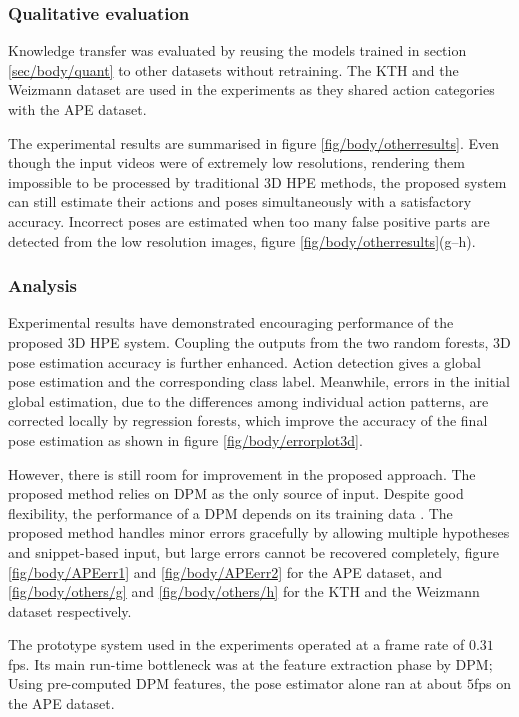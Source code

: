 

\subsubsection{Qualitative evaluation}

Knowledge transfer was evaluated by reusing the models trained in section \ref{sec/body/quant} to other datasets without retraining.
The KTH \cite{Schuldt2004} and the Weizmann \cite{Gorelick2007} dataset are used in the experiments as they shared action categories with the APE dataset. 

The experimental results are summarised in figure \ref{fig/body/otherresults}. Even though the input videos were of extremely low resolutions, rendering them impossible to be processed by traditional 3D HPE methods, the proposed system can still estimate their actions and poses simultaneously with a satisfactory accuracy. 
Incorrect poses are estimated when too many false positive parts are detected from the low resolution images, \eg figure \ref{fig/body/otherresults}(g--h). 

\subsubsection{Analysis}
Experimental results have demonstrated encouraging performance of the proposed 3D HPE system.  
Coupling the outputs from the two random forests, 3D pose estimation accuracy is further enhanced. Action detection gives a global pose estimation and the corresponding class label. Meanwhile, errors in the initial global estimation, due to the differences among individual action patterns, are corrected locally by regression forests, which improve the accuracy of the final pose estimation as shown in figure \ref{fig/body/errorplot3d}. 

However, there is still room for improvement in the proposed approach. The proposed method relies on DPM as the only source of input. Despite good flexibility, the performance of a DPM depends on its training data \cite{Yang2011, Eichner2012}. The proposed method handles minor errors gracefully by allowing multiple hypotheses and snippet-based input, but large errors cannot be recovered completely, \eg figure \ref{fig/body/APEerr1} and \ref{fig/body/APEerr2} for the APE dataset, and \ref{fig/body/others/g} and \ref{fig/body/others/h} for the KTH and the Weizmann dataset respectively. 

The prototype system used in the experiments operated at a frame rate of $0.31$fps. Its main run-time bottleneck was at the feature extraction phase by DPM; Using pre-computed DPM features, the pose estimator alone ran at about $5$fps on the APE dataset. 

